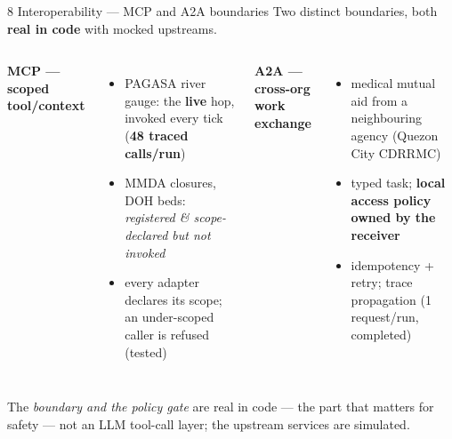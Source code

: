 \documentclass[aspectratio=169,11pt]{beamer}
\begin{document}
\begin{frame}{8 \;\; Interoperability --- MCP and A2A boundaries}
  \small
  Two distinct boundaries, both \textbf{real in code} with mocked upstreams.
  \begin{columns}[T]
    \textbf{MCP --- scoped tool/context}
    \begin{itemize}\footnotesize
      \item PAGASA river gauge: the \textbf{live} hop, invoked every tick (\textbf{48 traced calls/run})
      \item MMDA closures, DOH beds: \emph{registered \& scope-declared but not invoked}
      \item every adapter declares its scope; an under-scoped caller is refused (tested)
    \end{itemize}
    \textbf{A2A --- cross-org work exchange}
    \begin{itemize}\footnotesize
      \item medical mutual aid from a neighbouring agency (Quezon City CDRRMC)
      \item typed task; \textbf{local access policy owned by the receiver}
      \item idempotency + retry; trace propagation (1 request/run, completed)
    \end{itemize}
  \end{columns}
  \vspace{0.4em}
  \footnotesize The \emph{boundary and the policy gate} are real in code --- the part that matters for
  safety --- not an LLM tool-call layer; the upstream services are simulated.
\end{frame}
\end{document}
